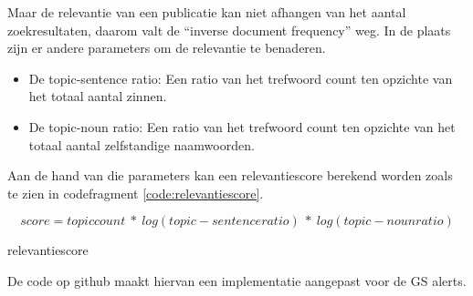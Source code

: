Maar de relevantie van een publicatie kan niet afhangen van het aantal zoekresultaten, daarom valt de ``inverse document frequency'' weg. In de plaats zijn er andere parameters om de relevantie te benaderen.
\begin{itemize}
    \item De topic-sentence ratio: Een ratio van het trefwoord count ten opzichte van het totaal aantal zinnen.
    \item De topic-noun ratio: Een ratio van het trefwoord count ten opzichte van het totaal aantal zelfstandige naamwoorden.
\end{itemize}
Aan de hand van die parameters kan een relevantiescore berekend worden zoals te zien in codefragment \ref{code:relevantiescore}.
\begin{listing}
    \begin{equation}
        score=topic count\ \ast\ log\left(topic-sentence ratio\right)\ \ast\ log\left(topic-noun ratio\right)
    \end{equation}  
    \caption[relevantiescore]{relevantiescore}
    \label{code:relevantiescore}
\end{listing}
De code op github \textcite{Depaepenlp2025} maakt hiervan een implementatie aangepast voor de GS alerts.
